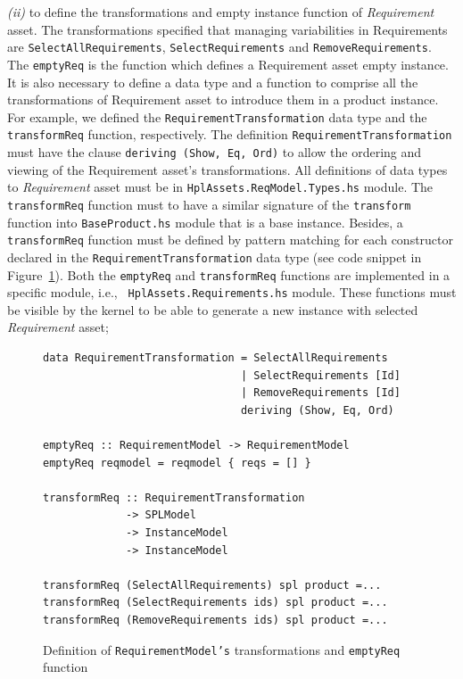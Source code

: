 \textit{(ii)} to define the transformations and empty instance function of \textit{Requirement} asset. The transformations specified that managing variabilities in Requirements are \texttt{SelectAllRequirements}, \texttt{SelectRequirements} and \texttt{RemoveRequirements}. The \texttt{emptyReq} is the function which defines a Requirement asset empty instance. It is also necessary to define a data type and a function to comprise all the transformations of Requirement asset to introduce them in a product \hpl{} instance. For example, we defined the \texttt{RequirementTransformation} data type and the \texttt{transformReq} function, respectively. The definition \texttt{RequirementTransformation} must have the clause \texttt{deriving (Show, Eq, Ord)} to allow the ordering and viewing of the Requirement asset's transformations. All definitions of data types to \textit{Requirement} asset must be in \texttt{HplAssets.ReqModel.Types.hs} module. The \texttt{transformReq} function must to have a similar signature of the \texttt{transform} function into \texttt{BaseProduct.hs} module that is a \hpl{} base instance. Besides, a \texttt{transformReq} function must be defined by pattern matching for each constructor declared in the \texttt{RequirementTransformation} data type (see code snippet in Figure~\ref{fig:code-req-transf}).
Both the \texttt{emptyReq} and \texttt{transformReq} functions are implemented in a specific module, i.e., 
\texttt{ HplAssets.Requirements.hs} module. 
These functions must be visible by the \hpl{} kernel to be able to generate a new \hpl{} instance with selected \textit{Requirement} asset; 

\begin{figure}
\begin{lstlisting}
data RequirementTransformation = SelectAllRequirements 
                               | SelectRequirements [Id]
                               | RemoveRequirements [Id]
                               deriving (Show, Eq, Ord)
			       
emptyReq :: RequirementModel -> RequirementModel
emptyReq reqmodel = reqmodel { reqs = [] }

transformReq :: RequirementTransformation 
             -> SPLModel 
             -> InstanceModel 
             -> InstanceModel
             
transformReq (SelectAllRequirements) spl product =...
transformReq (SelectRequirements ids) spl product =...
transformReq (RemoveRequirements ids) spl product =...
\end{lstlisting}  
\caption{Definition of \texttt{RequirementModel's} transformations and \texttt{emptyReq} function}
\label{fig:code-req-transf}
\end{figure}   
 

